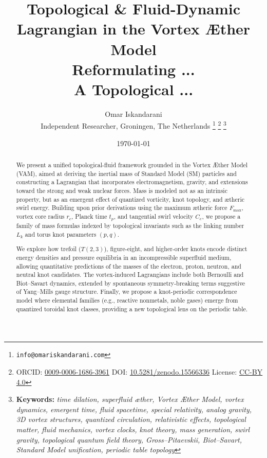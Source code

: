 \documentclass[a4paper,12pt]{article}
\begin{document}
    \author{
        Omar Iskandarani\\
        \small Independent Researcher, Groningen, The Netherlands
        \thanks{\texttt{info@omariskandarani.com}}
        \thanks{ORCID: \href{https://orcid.org/0009-0006-1686-3961}{0009-0006-1686-3961} \quad DOI: \href{https://doi.org/10.5281/zenodo.15566336}{10.5281/zenodo.15566336} \quad License: \href{https://creativecommons.org/licenses/by/4.0/}{CC-BY 4.0}}
        \noindent\thanks{\textbf{Keywords:} \textit{time dilation, superfluid æther, Vortex Æther Model, vortex dynamics, emergent time, fluid spacetime, special relativity, analog gravity, 3D vortex structures, quantized circulation, relativistic effects, topological matter, fluid mechanics, vortex clocks, knot theory, mass generation, swirl gravity, topological quantum field theory, Gross--Pitaevskii, Biot--Savart, Standard Model unification, periodic table topology}}
    }

    \title{
        \textbf{Topological \& Fluid-Dynamic Lagrangian in the Vortex Æther Model}\\[0.5em]
        \large Reformulating ... \\
        \normalsize A Topological ...
    }
    \date{\today}

    \maketitle

    \begin{abstract}
        We present a unified topological-fluid framework grounded in the Vortex Æther Model (VAM), aimed at deriving the inertial mass of Standard Model (SM) particles and constructing a Lagrangian that incorporates electromagnetism, gravity, and extensions toward the strong and weak nuclear forces. Mass is modeled not as an intrinsic property, but as an emergent effect of quantized vorticity, knot topology, and ætheric swirl energy. Building upon prior derivations using the maximum ætheric force $F_{\max}$, vortex core radius $r_c$, Planck time $t_p$, and tangential swirl velocity $C_e$, we propose a family of mass formulas indexed by topological invariants such as the linking number $L_k$ and torus knot parameters $(p,q)$.

        We explore how trefoil ($T(2,3)$), figure-eight, and higher-order knots encode distinct energy densities and pressure equilibria in an incompressible superfluid medium, allowing quantitative predictions of the masses of the electron, proton, neutron, and neutral knot candidates. The vortex-induced Lagrangians include both Bernoulli and Biot--Savart dynamics, extended by spontaneous symmetry-breaking terms suggestive of Yang--Mills gauge structure. Finally, we propose a knot-periodic correspondence model where elemental families (e.g., reactive nonmetals, noble gases) emerge from quantized toroidal knot classes, providing a new topological lens on the periodic table.
    \end{abstract}
\end{document}
